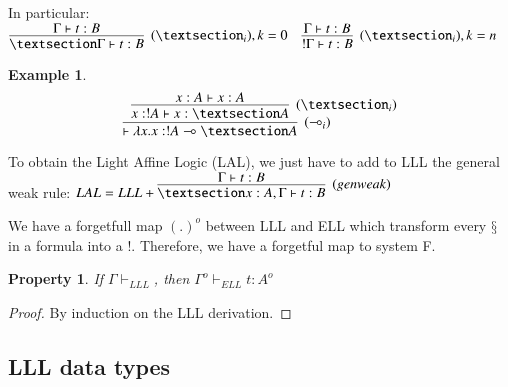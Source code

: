 \documentclass[a4paper,10pt]{article}
\newcommand{\limpl}{\multimap}  %
\newtheorem{prop}{Property}
\newtheorem{ex}{Example}
\begin{document}
In particular:
$	\infer[(§_i), k=0]{§\Gamma \vdash t: B}{\Gamma \vdash t: B} \quad
	\infer[(§_i), k=n]{!\Gamma \vdash t: B}{\Gamma \vdash t: B}
$

\begin{ex}
$$ \infer[(\limpl_i)]{\vdash \lambda x.x : !A \limpl §A}{
	\infer[(§_i)]{x:!A \vdash x:§A}{x:A \vdash x:A}
	}
$$
\end{ex}

\par To obtain the Light Affine Logic (LAL), we just have to add to LLL the general weak rule:
$LAL = LLL + \infer[(gen weak)]{§x:A, \Gamma \vdash t: B}{\Gamma \vdash t: B}$

\par We have a forgetfull map $(.)^{o}$ between LLL and ELL which transform every $§$ in a formula into a $!$. Therefore, we have a forgetful map to system F.

\begin{prop}
If $\Gamma \vdash_{LLL}$, then $\Gamma^o \vdash_{ELL} t:A^o$
\end{prop}
\begin{proof}
By induction on the LLL derivation.
\end{proof}


\subsection{LLL data types}







\end{document}
